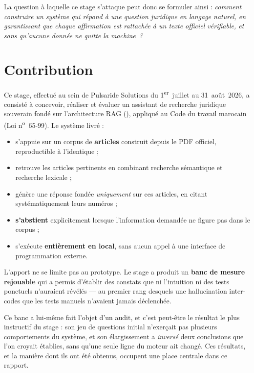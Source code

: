 La question à laquelle ce stage s'attaque peut donc se formuler ainsi : \emph{comment construire
un système qui répond à une question juridique en langage naturel, en garantissant que chaque
affirmation est rattachée à un texte officiel vérifiable, et sans qu'aucune donnée ne quitte la
machine~?}

\section*{Contribution}

Ce stage, effectué au sein de Pulsaride Solutions du 1\textsuperscript{er}~juillet au
31~août~2026, a consisté à concevoir, réaliser et évaluer un assistant de recherche juridique
souverain fondé sur l'architecture RAG (), appliqué au
Code du travail marocain (Loi n\textsuperscript{o}~65-99). Le système livré :

\begin{itemize}
  \item s'appuie sur un corpus de \textbf{\NbArticles{} articles} construit depuis le PDF
        officiel, reproductible à l'identique ;
  \item retrouve les articles pertinents en combinant recherche sémantique et recherche
        lexicale ;
  \item génère une réponse fondée \emph{uniquement} sur ces articles, en citant systématiquement
        leurs numéros ;
  \item \textbf{s'abstient} explicitement lorsque l'information demandée ne figure pas dans le
        corpus ;
  \item s'exécute \textbf{entièrement en local}, sans aucun appel à une interface de
        programmation externe.
\end{itemize}

L'apport ne se limite pas au prototype. Le stage a produit un \textbf{banc de mesure rejouable}
qui a permis d'établir des constats que ni l'intuition ni des tests ponctuels n'auraient
révélés --- au premier rang desquels une hallucination inter-codes que les tests manuels n'avaient
jamais déclenchée.

Ce banc a lui-même fait l'objet d'un audit, et c'est peut-être le résultat le plus instructif du
stage : son jeu de questions initial n'exerçait pas plusieurs comportements du système, et son
élargissement a \emph{inversé} deux conclusions que l'on croyait établies, sans qu'une seule ligne
du moteur ait changé. Ces résultats, et la manière dont ils ont été obtenus, occupent une place
centrale dans ce rapport.

